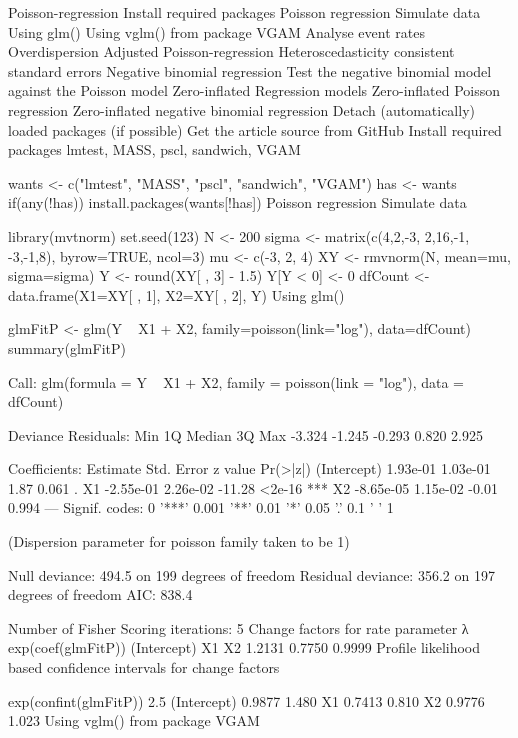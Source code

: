 Poisson-regression
Install required packages
Poisson regression
Simulate data
Using glm()
Using vglm() from package VGAM
Analyse event rates
Overdispersion
Adjusted Poisson-regression
Heteroscedasticity consistent standard errors
Negative binomial regression
Test the negative binomial model against the Poisson model
Zero-inflated Regression models
Zero-inflated Poisson regression
Zero-inflated negative binomial regression
Detach (automatically) loaded packages (if possible)
Get the article source from GitHub
Install required packages
lmtest, MASS, pscl, sandwich, VGAM

wants <- c("lmtest", "MASS", "pscl", "sandwich", "VGAM")
has   <- wants %
if(any(!has)) install.packages(wants[!has])
Poisson regression
Simulate data

library(mvtnorm)
set.seed(123)
N     <- 200
sigma <- matrix(c(4,2,-3, 2,16,-1, -3,-1,8), byrow=TRUE, ncol=3)
mu    <- c(-3, 2, 4)
XY    <- rmvnorm(N, mean=mu, sigma=sigma)
Y     <- round(XY[ , 3] - 1.5)
Y[Y < 0] <- 0
dfCount <- data.frame(X1=XY[ , 1], X2=XY[ , 2], Y)
Using glm()

glmFitP <- glm(Y ~ X1 + X2, family=poisson(link="log"), data=dfCount)
summary(glmFitP)

Call:
glm(formula = Y ~ X1 + X2, family = poisson(link = "log"), data = dfCount)

Deviance Residuals: 
   Min      1Q  Median      3Q     Max  
-3.324  -1.245  -0.293   0.820   2.925  

Coefficients:
             Estimate Std. Error z value Pr(>|z|)    
(Intercept)  1.93e-01   1.03e-01    1.87    0.061 .  
X1          -2.55e-01   2.26e-02  -11.28   <2e-16 ***
X2          -8.65e-05   1.15e-02   -0.01    0.994    
---
Signif. codes:  0 '***' 0.001 '**' 0.01 '*' 0.05 '.' 0.1 ' ' 1 

(Dispersion parameter for poisson family taken to be 1)

    Null deviance: 494.5  on 199  degrees of freedom
Residual deviance: 356.2  on 197  degrees of freedom
AIC: 838.4

Number of Fisher Scoring iterations: 5
Change factors for rate parameter λ
exp(coef(glmFitP))
(Intercept)          X1          X2 
     1.2131      0.7750      0.9999 
Profile likelihood based confidence intervals for change factors

exp(confint(glmFitP))
             2.5 %
(Intercept) 0.9877  1.480
X1          0.7413  0.810
X2          0.9776  1.023
Using vglm() from package VGAM

